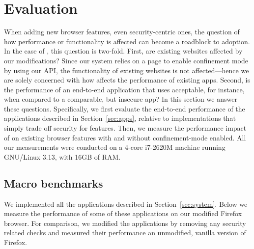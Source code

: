 \section{Evaluation}
\label{sec:eval}

When adding new browser features, even security-centric ones, the
question of how performance or functionality is affected can become a
roadblock to adoption.
%
In the case of \sys{}, this question is two-fold.
%
First, are existing websites affected by our modifications?
%
Since our system relies on a page to enable confinement mode by using
our API, the functionality of existing websites is not
affected---hence we are solely concerned with how \sys{} affects the
performance of existing apps.
%
Second, is the performance of an end-to-end application that uses
\sys{} acceptable, for instance, when compared to a comparable, but
insecure app?
%
In this section we answer these questions.
%
Specifically, we first evaluate the end-to-end performance of the
applications described in Section~\ref{sec:apps}, relative to
implementations that simply trade off security for features.
%
Then, we measure the performance impact of \sys{} on existing browser
features with and without confinement-mode enabled.
%
All our measurements were conducted on a 4-core i7-2620M machine
running GNU/Linux 3.13, with 16GB of RAM.
%


\subsection{Macro benchmarks}
\label{sec:eval:macro}

We implemented all the applications described in
Section~\ref{sec:system}.
%
Below we measure the performance of some of these applications on our
modified Firefox browser.
%
For comparison, we modified the applications by removing any security
related checks and measured their performance an unmodified, vanilla
version of Firefox.

